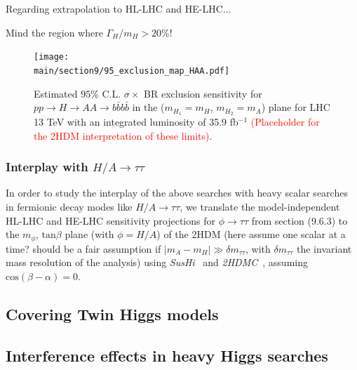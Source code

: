 \documentclass[../report.tex]{subfiles}
\providecommand{\main}{..}
\begin{document}
Regarding extrapolation to HL-LHC and HE-LHC...

Mind the region where $\Gamma_H/m_H > 20\%$!

\begin{figure}[h]
\begin{center}
\texttt{[image: \\main/section9/95\_exclusion\_map\_HAA.pdf]}
\caption{\small Estimated $95\%$ C.L. $\sigma \times$ BR exclusion sensitivity for $p p \to H \to A A \to b \bar{b} b \bar{b}$ 
in the ($m_{H_1} = m_H$, $m_{H_2} = m_A$) plane for LHC 13 TeV with an integrated luminosity of 35.9 fb$^{-1}$ \textcolor{red}{(Placeholder for the 
2HDM interpretation of these limits)}.}
\label{Fig_HAA_2D_Limits}
\end{center}
\end{figure}


\subsubsection{Interplay with $H/A \to \tau\tau$}

In order to study the interplay of the above searches with heavy scalar searches in fermionic decay modes like $H/A \to \tau\tau$, 
we translate the model-independent HL-LHC and HE-LHC sensitivity projections for $\phi \to \tau\tau$ from section (9.6.3) 
to the $m_{\phi}$, $\mathrm{tan}\beta$ plane (with $\phi = H/A$) of the 2HDM (here assume one scalar at a time? should be a fair assumption if 
$|m_A - m_H| \gg \delta m_{\tau\tau}$, with $\delta m_{\tau\tau}$ the invariant mass resolution of the analysis)
using {\sl SusHi}~\cite{Harlander:2012pb} and {\sl 2HDMC}~\cite{Eriksson:2009ws}, assuming 
$\mathrm{cos}(\beta - \alpha) = 0$.



\subsection{Covering Twin Higgs models}

\subsection{Interference effects in heavy Higgs searches}



\end{document}
